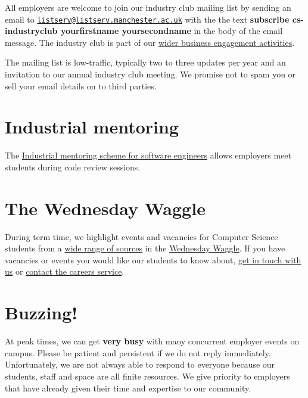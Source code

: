 \documentclass[12pt,]{book}
\begin{document}
All employers are welcome to join our industry club mailing list by sending an email to \href{mailto:listserv@listserv.manchester.ac.uk}{\nolinkurl{listserv@listserv.manchester.ac.uk}} with the the text \textbf{subscribe cs-industryclub yourfirstname yoursecondname} in the body of the email message. The industry club is part of our \href{https://www.cs.manchester.ac.uk/connect/business-engagement/}{wider business engagement activities}.

The mailing list is low-traffic, typically two to three updates per year and an invitation to our annual industry club meeting. We promise not to spam you or sell your email details on to third parties.

\hypertarget{industrial-mentoring}{%
\section{Industrial mentoring}\label{industrial-mentoring}}

The \href{https://www.cs.manchester.ac.uk/connect/business-engagement/industrial-mentoring/}{Industrial mentoring scheme for software engineers} allows employers meet students during code review sessions.

\hypertarget{the-wednesday-waggle}{%
\section{The Wednesday Waggle}\label{the-wednesday-waggle}}

During term time, we highlight events and vacancies for Computer Science students from a \href{http://dullhunk.github.io/where-can-I-look-for-jobs.html}{wide range of sources} in the \href{https://waggle.cs.manchester.ac.uk/waggle/about}{Wednesday Waggle}. If you have vacancies or events you would like our students to know about, \protect\hyperlink{contact}{get in touch with us} or \href{http://www.careers.manchester.ac.uk/aboutus/contact/}{contact the careers service}.

\hypertarget{buzzing}{%
\section{Buzzing! 🐝}\label{buzzing}}

At peak times, we can get \textbf{very busy} with many concurrent employer events on campus. \citep{highfliers2019} Please be patient and persistent if we do not reply immediately. Unfortunately, we are not always able to respond to everyone because our students, staff and space are all finite resources. We give priority to employers that have already given their time and expertise to our community.
\end{document}
